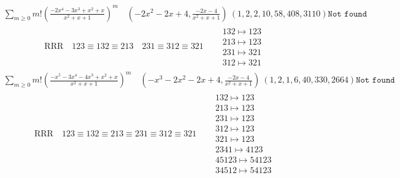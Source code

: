 \documentclass{article}
\begin{document}
$$
\begin{matrix}
\sum_{m \geq 0} m! \left(
\frac{-2 x^{4} - 3 x^{3} + x^{2} + x}{x^{2} + x + 1}
\right)^m
\quad
\left(-2 x^{2} - 2 x + 4, \frac{-2 x - 4}{x^{2} + x + 1}\right)
\ 
\left(1, 2, 2, 10, 58, 408, 3110\right)
\texttt{
Not found
}
\end{matrix}
$$
\begin{align}
\text{RRR}
\quad
123\equiv132\equiv213
\quad
231\equiv312\equiv321
\quad
&
\begin{matrix}
132 \mapsto 123
\\
213 \mapsto 123
\\
231 \mapsto 321
\\
312 \mapsto 321
\end{matrix}
\end{align}
$$
\begin{matrix}
\sum_{m \geq 0} m! \left(
\frac{-x^{5} - 3 x^{4} - 4 x^{3} + x^{2} + x}{x^{2} + x + 1}
\right)^m
\quad
\left(-x^{3} - 2 x^{2} - 2 x + 4, \frac{-2 x - 4}{x^{2} + x + 1}\right)
\ 
\left(1, 2, 1, 6, 40, 330, 2664\right)
\texttt{
Not found
}
\end{matrix}
$$
\begin{align}
\text{RRR}
\quad
123\equiv132\equiv213\equiv231\equiv312\equiv321
\quad
&
\begin{matrix}
132 \mapsto 123
\\
213 \mapsto 123
\\
231 \mapsto 123
\\
312 \mapsto 123
\\
321 \mapsto 123
\\
2341 \mapsto 4123
\\
45123 \mapsto 54123
\\
34512 \mapsto 54123
\end{matrix}
\end{align}
\end{document}

